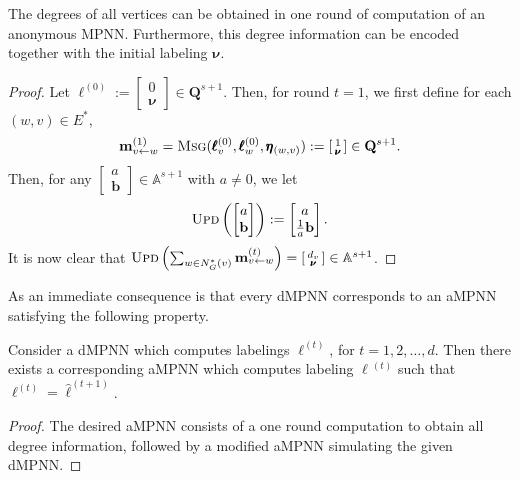 \begin{lemma}
	The degrees of all vertices can be obtained in one round of computation of an anonymous MPNN. Furthermore, this degree information can be encoded together with the initial labeling $\pmb{\nu}$.
	\end{lemma}
\begin{proof}
Let $\pmb{\ell}^{(0)}:=\left[\begin{smallmatrix}0\\\pmb{\nu}\end{smallmatrix}\right]\in\mathbf{Q}^{s+1}$. Then, for round $t=1$, we first define for each $(w,v)\in E^*$, 
$$\mathbf{m}^{(1)}_{v\gets w}=\textsc{Msg}(\pmb{\ell}^{(0)}_v,\pmb{\ell}^{(0)}_{w},\pmb{\eta}_{(w,v)}):=\left[\begin{smallmatrix}1\\\pmb{\nu}\end{smallmatrix}\right]\in\mathbf{Q}^{s+1}.$$ Then, for any
$\left[\begin{smallmatrix} a\\\mathbf{b}\end{smallmatrix}\right]\in \mathbb{A}^{s+1}$ with $a\neq 0$, we 
let 
$$\textsc{Upd}\left(\begin{bmatrix} a\\\mathbf{b}\end{bmatrix}\right):=\begin{bmatrix} a\\\frac{1}{a}\mathbf{b}\end{bmatrix}.
$$
It is now clear that $\textsc{Upd}\left(\sum_{w\in N_G^*(v)}\mathbf{m}_{v\gets w}^{(t)}\right)=\left[\begin{smallmatrix} d_v\\\pmb{\nu}\end{smallmatrix}\right]\in \mathbb{A}^{s+1}$.
\end{proof}

As an immediate consequence is that every dMPNN corresponds to an aMPNN satisfying the following property.
\begin{proposition}\label{prop:onestep}
Consider a dMPNN which computes labelings $\pmb{\ell}^{(t)}$, for $t=1,2,\ldots,d$. Then there exists a corresponding aMPNN which computes labeling $\hat{\pmb{\ell}}{}^{(t)}$ such that $\pmb{\ell}^{(t)}=\hat{\pmb{\ell}}^{(t+1)}$.
\end{proposition}
\begin{proof}
	The desired aMPNN consists of a one round computation to obtain all degree information, followed by a modified aMPNN simulating the given dMPNN.
\end{proof}

